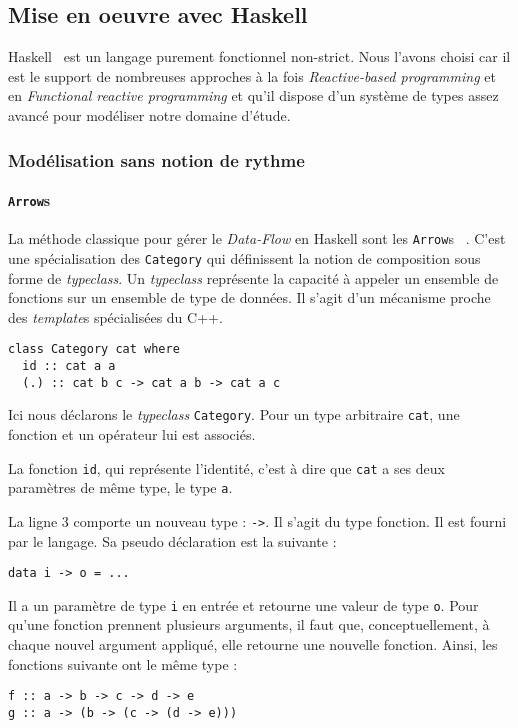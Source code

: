 \documentclass{llncs}
\newcommand{\DF}{\emph{Data-Flow} }
\newcommand{\RP}{\emph{Reactive-based programming} }
\newcommand{\FRP}{\emph{Functional reactive programming} }
\newcommand{\Arrs}{\lstinline{Arrow}s }
\begin{document}
\subsection{Mise en oeuvre avec Haskell}
Haskell~\cite{Haskell10} est un langage purement fonctionnel non-strict.
Nous l'avons choisi car il est le support de nombreuses approches à la fois \RP
et en \FRP et qu'il dispose d'un système de types assez avancé pour modéliser
notre domaine d'étude.

\subsubsection{Modélisation sans notion de rythme}
\paragraph{\Arrs}
La méthode classique pour gérer le \DF en Haskell sont les \Arrs~\cite{Hughes00}.
C'est une spécialisation des \lstinline{Category}
qui définissent la notion de composition sous forme de \emph{typeclass}.
Un \emph{typeclass} représente la capacité à appeler un ensemble
de fonctions sur un ensemble de type de données.
Il s'agit d'un mécanisme proche des \emph{template}s spécialisées du C++.

\begin{lstlisting}
class Category cat where
  id :: cat a a
  (.) :: cat b c -> cat a b -> cat a c
\end{lstlisting}

Ici nous déclarons le \emph{typeclass} \lstinline{Category}.
Pour un type arbitraire \lstinline{cat}, une fonction et un opérateur lui est
associés.

La fonction \lstinline{id}, qui représente l'identité, c'est à dire
que \lstinline{cat} a ses deux paramètres de même type, le type \lstinline{a}.

La ligne 3 comporte un nouveau type : \lstinline{->}.
Il s'agit du type fonction.
Il est fourni par le langage.
Sa pseudo déclaration est la suivante :
\begin{lstlisting}
data i -> o = ...
\end{lstlisting}
Il a un paramètre de type \lstinline{i} en entrée et retourne une
valeur de type \lstinline{o}.
Pour qu'une fonction prennent plusieurs arguments, il faut que, conceptuellement,
à chaque nouvel argument appliqué, elle retourne une nouvelle fonction.
Ainsi, les fonctions suivante ont le même type :
\begin{lstlisting}
f :: a -> b -> c -> d -> e
g :: a -> (b -> (c -> (d -> e)))
\end{lstlisting}
\end{document}
